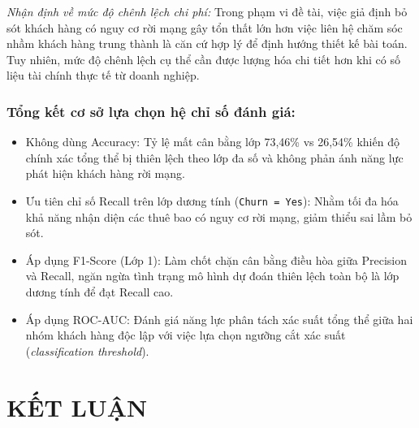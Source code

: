 \documentclass[a4paper]{article}
\begin{document}
{\noindent \textit{Nhận định về mức độ chênh lệch chi phí:} Trong phạm vi đề tài, việc giả định bỏ sót khách hàng có nguy cơ rời mạng gây tổn thất lớn hơn việc liên hệ chăm sóc nhầm khách hàng trung thành là căn cứ hợp lý để định hướng thiết kế bài toán. Tuy nhiên, mức độ chênh lệch cụ thể cần được lượng hóa chi tiết hơn khi có số liệu tài chính thực tế từ doanh nghiệp.

\subsubsection*{\textbf{Tổng kết cơ sở lựa chọn hệ chỉ số đánh giá:}}
\begin{itemize}[nosep, topsep=2pt, itemsep=2pt]
    \item Không dùng Accuracy: Tỷ lệ mất cân bằng lớp 73,46\% vs 26,54\% khiến độ chính xác tổng thể bị thiên lệch theo lớp đa số và không phản ánh năng lực phát hiện khách hàng rời mạng.
    \item Ưu tiên chỉ số Recall trên lớp dương tính (\texttt{Churn = Yes}): Nhằm tối đa hóa khả năng nhận diện các thuê bao có nguy cơ rời mạng, giảm thiểu sai lầm bỏ sót.
    \item Áp dụng F1-Score (Lớp 1): Làm chốt chặn cân bằng điều hòa giữa Precision và Recall, ngăn ngừa tình trạng mô hình dự đoán thiên lệch toàn bộ là lớp dương tính để đạt Recall cao.
    \item Áp dụng ROC-AUC: Đánh giá năng lực phân tách xác suất tổng thể giữa hai nhóm khách hàng độc lập với việc lựa chọn ngưỡng cắt xác suất (\textit{classification threshold}).
\end{itemize}

\vspace{1.5em}
\section*{\textbf{KẾT LUẬN}}

}
\end{document}
